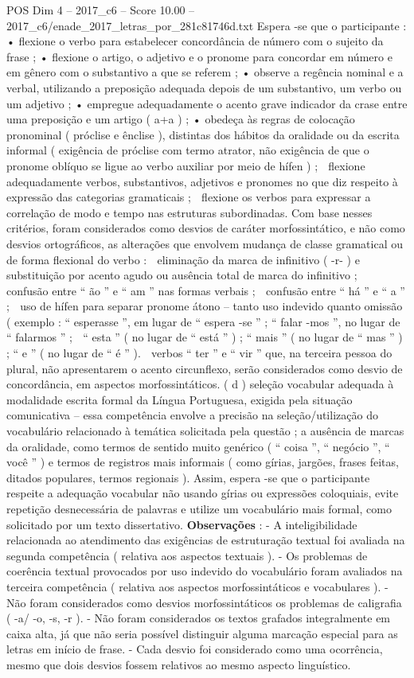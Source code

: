 \begin{textsample}{POS Dim 4 – 2017\_c6 – Score 10.00 – 2017\_c6/enade\_2017\_letras\_por\_281c81746d.txt}
Espera -se que o participante : • flexione o verbo para estabelecer concordância de número com o sujeito da frase ; • flexione o artigo, o adjetivo e o pronome para concordar em número e em gênero com o substantivo a que se referem ; • observe a regência nominal e a verbal, utilizando a preposição adequada depois de um substantivo, um verbo ou um adjetivo ; • empregue adequadamente o acento grave indicador da crase entre uma preposição e um artigo ( a+a ) ; • obedeça às regras de colocação pronominal ( próclise e ênclise ), distintas dos hábitos da oralidade ou da escrita informal ( exigência de próclise com termo atrator, não exigência de que o pronome oblíquo se ligue ao verbo auxiliar por meio de hífen ) ;  flexione adequadamente verbos, substantivos, adjetivos e pronomes no que diz respeito à expressão das categorias gramaticais ;  flexione os verbos para expressar a correlação de modo e tempo nas estruturas subordinadas.
Com base nesses critérios, foram considerados como desvios de caráter morfossintático, e não como desvios ortográficos, as alterações que envolvem mudança de classe gramatical ou de forma flexional do verbo :  eliminação da marca de infinitivo ( -r- ) e substituição por acento agudo ou ausência total de marca do infinitivo ;  confusão entre “ ão ” e “ am ” nas formas verbais ;  confusão entre “ há ” e “ a ” ;  uso de hífen para separar pronome átono – tanto uso indevido quanto omissão ( exemplo : “ esperasse ”, em lugar de “ espera -se ” ; “ falar -mos ”, no lugar de “ falarmos ” ;  “ esta ” ( no lugar de “ está ” ) ; “ mais ” ( no lugar de “ mas ” ) ; “ e ” ( no lugar de “ é ” ).  verbos “ ter ” e “ vir ” que, na terceira pessoa do plural, não apresentarem o acento circunflexo, serão considerados como desvio de concordância, em aspectos morfossintáticos. ( d ) seleção vocabular adequada à modalidade escrita formal da Língua Portuguesa, exigida pela situação comunicativa – essa competência envolve a precisão na seleção/utilização do vocabulário relacionado à temática solicitada pela questão ; a ausência de marcas da oralidade, como termos de sentido muito genérico ( “ coisa ”, “ negócio ”, “ você ” ) e termos de registros mais informais ( como gírias, jargões, frases feitas, ditados populares, termos regionais ).
Assim, espera -se que o participante respeite a adequação vocabular não usando gírias ou expressões coloquiais, evite repetição desnecessária de palavras e utilize um vocabulário mais formal, como solicitado por um texto dissertativo. \textbf{Observações} : - A inteligibilidade relacionada ao atendimento das exigências de estruturação textual foi avaliada na segunda competência ( relativa aos aspectos textuais ). - Os problemas de coerência textual provocados por uso indevido do vocabulário foram avaliados na terceira competência ( relativa aos aspectos morfossintáticos e vocabulares ). - Não foram considerados como desvios morfossintáticos os problemas de caligrafia ( -a/ -o, -s, -r ). - Não foram considerados os textos grafados integralmente em caixa alta, já que não seria possível distinguir alguma marcação especial para as letras em início de frase. - Cada desvio foi considerado como uma ocorrência, mesmo que dois desvios fossem relativos ao mesmo aspecto linguístico.

\end{textsample}
